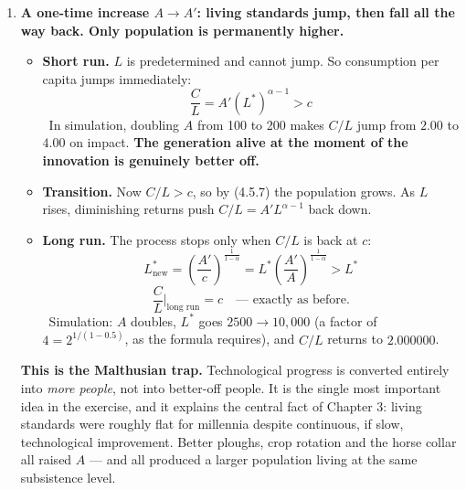 \documentclass[12pt, letterpaper]{article}
\newcommand{\stst}{^{\ast}}
\begin{document}
\begin{tcolorbox}[oddbox,title={Problem 4.5 \quad A Malthusian Model}]
\begin{enumerate}
\textbf{Stability.} For $L < L\stst$, $AL^{\alpha-1} > c$, so $L$ grows; for $L > L\stst$ it
shrinks. Globally stable, converging monotonically. \checkmark\ (Simulation from $L_0 = 500$
with $A=100$, $c=2$, $\alpha=0.5$ converges to $L\stst = 2500$ exactly.)

\textbf{And here is the punchline:} at the steady state
$$\frac{C}{L} = A (L\stst)^{\alpha-1} = c$$
\textbf{GDP per capita equals subsistence, always.} It cannot be anything else --- if it were
above, population would grow and push it down; if below, population would fall and push it
up. So:
\begin{itemize}[leftmargin=1.3em,itemsep=2pt,topsep=2pt]
\item \textbf{GDP per capita: no long-run growth.} It is pinned at $c$.
\item \textbf{Population: no long-run growth.} It converges to $L\stst$.
\end{itemize}

\item \textbf{A one-time increase $A \to A'$: living standards jump, then fall all the way
back. Only population is permanently higher.}

\begin{itemize}[leftmargin=1.3em,itemsep=4pt,topsep=2pt]
\item \textbf{Short run.} $L$ is predetermined and cannot jump. So consumption per capita
      jumps immediately:
      $$\frac{C}{L} = A' (L\stst)^{\alpha-1} > c$$
      \checkmark\ In simulation, doubling $A$ from 100 to 200 makes $C/L$ jump from $2.00$ to
      $4.00$ on impact. \textbf{The generation alive at the moment of the innovation is
      genuinely better off.}
\item \textbf{Transition.} Now $C/L > c$, so by (4.5.7) the population grows. As $L$ rises,
      diminishing returns push $C/L = A'L^{\alpha-1}$ back down.
\item \textbf{Long run.} The process stops only when $C/L$ is back at $c$:
      $$L\stst_{\text{new}} = \left(\frac{A'}{c}\right)^{\frac{1}{1-\alpha}}
      = L\stst \left(\frac{A'}{A}\right)^{\frac{1}{1-\alpha}} > L\stst$$
      $$\frac{C}{L}\Big|_{\text{long run}} = c \quad \text{--- exactly as before.}$$
      \checkmark\ Simulation: $A$ doubles, $L\stst$ goes $2500 \to 10{,}000$ (a factor of
      $4 = 2^{1/(1-0.5)}$, as the formula requires), and $C/L$ returns to $2.000000$.
\end{itemize}

\textbf{This is the Malthusian trap.} Technological progress is converted entirely into
\emph{more people}, not into better-off people. It is the single most important idea in the
exercise, and it explains the central fact of Chapter 3: living standards were roughly flat
for millennia despite continuous, if slow, technological improvement. Better ploughs, crop
rotation and the horse collar all raised $A$ --- and all produced a larger population living
at the same subsistence level.


\end{enumerate}
\end{tcolorbox}
\end{document}
